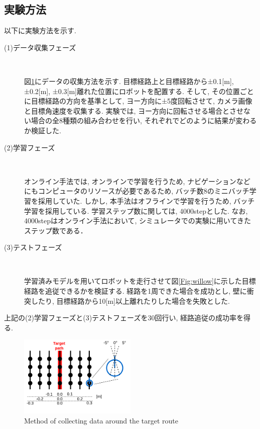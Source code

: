 \documentclass{ujarticle}
\begin{document}
\subsection{実験方法}
以下に実験方法を示す. 
\begin{description}
		\item[(1)データ収集フェーズ]　
		
		図\ref{Fig:collect-data}にデータの収集方法を示す. 目標経路上と目標経路から±0.1[m], ±0.2[m], ±0.3[m]離れた位置にロボットを配置する. そして, その位置ごとに目標経路の方向を基準として, ヨー方向に±5度回転させて, カメラ画像と目標角速度を収集する. 実験では, ヨー方向に回転させる場合とさせない場合の全8種類の組み合わせを行い, それぞれでどのように結果が変わるか検証した. 

		
		\item[(2)学習フェーズ]　
		
		オンライン手法では, オンラインで学習を行うため, ナビゲーションなどにもコンピュータのリソースが必要であるため, バッチ数8のミニバッチ学習を採用していた. しかし, 本手法はオフラインで学習を行うため, バッチ学習を採用している. 学習ステップ数に関しては, 4000stepとした. なお, 4000stepはオンライン手法において, シミュレータでの実験に用いてきたステップ数である． 
		\item[(3)テストフェーズ]　
		
		学習済みモデルを用いてロボットを走行させて図\ref{Fig:willow}に示した目標経路を追従できるかを検証する. 経路を1周できた場合を成功とし, 壁に衝突したり, 目標経路から10[m]以上離れたりした場合を失敗とした.
\end{description}
上記の(2)学習フェーズと(3)テストフェーズを30回行い, 経路追従の成功率を得る. 

\begin{figure}[h]
		\centering
		\includegraphics[width=0.5\textwidth]{img/collect2.png}
		\caption{Method of collecting data around the target route}
		\label{Fig:collect-data}
\end{figure}
\end{document}
